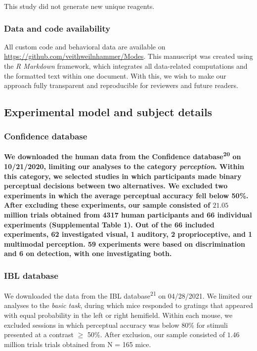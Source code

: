 \documentclass[
]{article}
\begin{document}
This study did not generate new unique reagents.

\hypertarget{data-and-code-availability}{%
\subsubsection{Data and code
availability}\label{data-and-code-availability}}

All custom code and behavioral data are available on
\url{https://github.com/veithweilnhammer/Modes}. This manuscript was
created using the \emph{R Markdown} framework, which integrates all
data-related computations and the formatted text within one document.
With this, we wish to make our approach fully transparent and
reproducible for reviewers and future readers.

\hypertarget{experimental-model-and-subject-details}{%
\subsection{Experimental model and subject
details}\label{experimental-model-and-subject-details}}

\hypertarget{confidence-database}{%
\subsubsection{Confidence database}\label{confidence-database}}

\textbf{We downloaded the human data from the Confidence
database\textsuperscript{20} on 10/21/2020, limiting our analyses to the
category \emph{perception}. Within this category, we selected studies in
which participants made binary perceptual decisions between two
alternatives. We excluded two experiments in which the average
perceptual accuracy fell below 50\%. After excluding these experiments,
our sample consisted of \(21.05\) million trials obtained from 4317
human participants and 66 individual experiments (Supplemental Table 1).
Out of the 66 included experiments, 62 investigated visual, 1 auditory,
2 proprioceptive, and 1 multimodal perception. 59 experiments were based
on discrimination and 6 on detection, with one investigating both.}

\hypertarget{ibl-database}{%
\subsubsection{IBL database}\label{ibl-database}}

We downloaded the data from the IBL database\textsuperscript{21} on
04/28/2021. We limited our analyses to the \emph{basic task}, during
which mice responded to gratings that appeared with equal probability in
the left or right hemifield. Within each mouse, we excluded sessions in
which perceptual accuracy was below 80\% for stimuli presented at a
contrast \(\geq\) 50\%. After exclusion, our sample consisted of
\(1.46\) million trials trials obtained from N = 165 mice.
\end{document}
